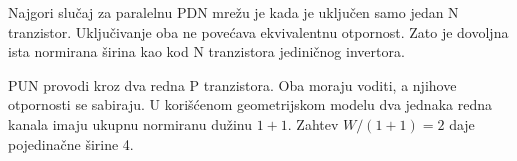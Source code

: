 Najgori slučaj za paralelnu PDN mrežu je kada je uključen samo jedan N tranzistor. Uključivanje oba ne povećava ekvivalentnu otpornost. Zato je dovoljna ista normirana širina kao kod N tranzistora jediničnog invertora.

PUN provodi kroz dva redna P tranzistora. Oba moraju voditi, a njihove otpornosti se sabiraju. U korišćenom geometrijskom modelu dva jednaka redna kanala imaju ukupnu normiranu dužinu $1+1$. Zahtev $W/(1+1)=2$ daje pojedinačne širine 4.
